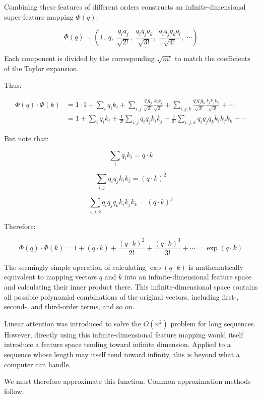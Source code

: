 Combining these features of different orders constructs an infinite-dimensional super-feature mapping \(\Phi(q)\):

\[
\Phi(q)=
\left(
1,\;
q,\;
\frac{q_i q_j}{\sqrt{2!}},\;
\frac{q_i q_j q_k}{\sqrt{3!}},\;
\frac{q_i q_j q_k q_l}{\sqrt{4!}},\;
\cdots
\right)
\]

Each component is divided by the corresponding \(\sqrt{m!}\) to match the coefficients of the Taylor expansion.

Thus:

\[
\begin{aligned}
\Phi(q)\cdot\Phi(k)
&= 1\cdot 1
+ \sum_i q_i k_i
+ \sum_{i,j}\frac{q_i q_j}{\sqrt{2!}}\frac{k_i k_j}{\sqrt{2!}}
+ \sum_{i,j,k}\frac{q_i q_j q_k}{\sqrt{3!}}\frac{k_i k_j k_k}{\sqrt{3!}}
+ \cdots \\
&= 1 + \sum_i q_i k_i
+ \frac{1}{2!}\sum_{i,j}q_i q_j k_i k_j
+ \frac{1}{3!}\sum_{i,j,k}q_i q_j q_k k_i k_j k_k
+ \cdots
\end{aligned}
\]

But note that:

\[
\sum_i q_i k_i = q\cdot k
\]

\[
\sum_{i,j}q_i q_j k_i k_j = (q\cdot k)^2
\]

\[
\sum_{i,j,k}q_i q_j q_k k_i k_j k_k = (q\cdot k)^3
\]

Therefore:

\[
\Phi(q)\cdot\Phi(k)
= 1 + (q\cdot k) + \frac{(q\cdot k)^2}{2!}
+ \frac{(q\cdot k)^3}{3!}
+ \cdots
= \exp(q\cdot k)
\]

The seemingly simple operation of calculating \(\exp(q\cdot k)\) is mathematically equivalent to mapping vectors \(q\) and \(k\) into an infinite-dimensional feature space and calculating their inner product there. This infinite-dimensional space contains all possible polynomial combinations of the original vectors, including first-, second-, and third-order terms, and so on.

Linear attention was introduced to solve the \(O(n^2)\) problem for long sequences. However, directly using this infinite-dimensional feature mapping would itself introduce a feature space tending toward infinite dimension. Applied to a sequence whose length may itself tend toward infinity, this is beyond what a computer can handle.

We must therefore approximate this function. Common approximation methods follow.

